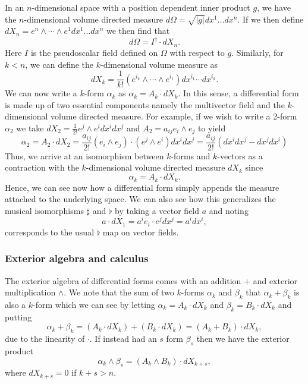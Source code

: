 In an $n$-dimensional space with a position dependent inner product $g$, we have the $n$-dimensional volume directed measure $d\Omega = \sqrt{|g|} dx^1\dots dx^n$. If we then define $dX_n = e^n \wedge \cdots \wedge e^1 dx^1 \dots dx^n$ we then find that
\[
d\Omega = I^\dagger \cdot dX_n.
\]
Here $I$ is the pseudoscalar field defined on $\Omega$ with respect to $g$. Similarly, for $k<n$, we can define the $k$-dimensional volume measure as 
\[
dX_k = \frac{1}{k!}(e^{i_k}\wedge \cdots \wedge e^{i_1}) dx^{i_1} \cdots dx^{i_k}.
\]
We can now write a $k$-form $\alpha_k$ as $\alpha_k = A_k \cdot dX_k$. In this sense, a differential form is made up of two essential components namely the multivector field and the $k$-dimensional volume directed measure. For example, if we wish to write a 2-form $\alpha_2$ we take $dX_2 = \frac{1}{2!} e^j \wedge e^i dx^i dx^j$ and $A_2 = a_{ij} e_i \wedge e_j$ to yield
\[
\alpha_2 = A_2 \cdot dX_2 = \frac{a_{ij}}{2!} (e_i \wedge e_j) \cdot (e^j \wedge e^i) dx^i dx^j = \frac{a_{ij}}{2!} (dx^i dx^j - dx^j dx^i)
\]
Thus, we arrive at an isomorphism between $k$-forms and $k$-vectors as a contraction with the $k$-dimensional volume directed measure $dX_k$ since
\[
\alpha_k = A_k \cdot dX_k.
\]
Hence, we can see now how a differential form simply appends the measure attached to the underlying space. We can also see how this generalizes the musical isomorphisms $\sharp$ and $\flat$ by taking a vector field $a$ and noting
\begin{equation}
\label{eq:line_element}
a \cdot dX_1 = a^i e_i \cdot e^j dx^j = a^i dx^i,
\end{equation}
corresponds to the usual $\flat$ map on vector fields.

\subsubsection{Exterior algebra and calculus}
The exterior algebra of differential forms comes with an addition $+$ and exterior multiplication $\wedge$.  We note that the sum of two $k$-forms $\alpha_k$ and $\beta_k$ that $\alpha_k+\beta_k$ is also a $k$-form which we can see by letting $\alpha_k = A_k \cdot dX_k$ and $\beta_k = B_k \cdot dX_k$ and putting
\[
\alpha_k + \beta_k = (A_k \cdot dX_k)+(B_k \cdot dX_k) = (A_k + B_k) \cdot dX_k,
\]
due to the linearity of $\cdot$.  If instead had an $s$ form $\beta_s$ then we have the exterior product
\[
\alpha_k \wedge \beta_s = (A_k \wedge B_k) \cdot dX_{k+s},
\]
where $dX_{k+s}=0$ if $k+s>n$.  

